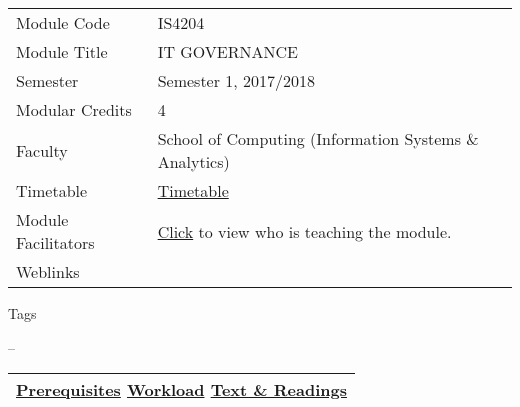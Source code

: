 \hypertarget{ctl00_ctl00_ContentPlaceHolder1_ContentPlaceHolder1_LV_itemPlaceholderContainer}{}
\begin{longtable}[]{@{}ll@{}}
\toprule
\protect\hypertarget{ctl00_ctl00_ContentPlaceHolder1_ContentPlaceHolder1_LV_ctrl0_txtCode}{}{Module
Code} &
\protect\hypertarget{ctl00_ctl00_ContentPlaceHolder1_ContentPlaceHolder1_LV_ctrl0_lcCode}{}{IS4204}\tabularnewline
\protect\hypertarget{ctl00_ctl00_ContentPlaceHolder1_ContentPlaceHolder1_LV_ctrl0_lcCourse}{}{Module
Title} &
\protect\hypertarget{ctl00_ctl00_ContentPlaceHolder1_ContentPlaceHolder1_LV_ctrl0_lcCourseName}{}{IT
GOVERNANCE}\tabularnewline
\protect\hypertarget{ctl00_ctl00_ContentPlaceHolder1_ContentPlaceHolder1_LV_ctrl0_lcSemester}{}{Semester}
&
\protect\hypertarget{ctl00_ctl00_ContentPlaceHolder1_ContentPlaceHolder1_LV_ctrl0_lcSem}{}{Semester
1, 2017/2018}\tabularnewline
\protect\hypertarget{ctl00_ctl00_ContentPlaceHolder1_ContentPlaceHolder1_LV_ctrl0_lcModCredit}{}{Modular
Credits} &
\protect\hypertarget{ctl00_ctl00_ContentPlaceHolder1_ContentPlaceHolder1_LV_ctrl0_lcModC}{}{4}\tabularnewline
\protect\hypertarget{ctl00_ctl00_ContentPlaceHolder1_ContentPlaceHolder1_LV_ctrl0_lcFaculty}{}{Faculty}
&
\protect\hypertarget{ctl00_ctl00_ContentPlaceHolder1_ContentPlaceHolder1_LV_ctrl0_lcFac}{}{School
of Computing (Information Systems \& Analytics)}\tabularnewline
\protect\hypertarget{ctl00_ctl00_ContentPlaceHolder1_ContentPlaceHolder1_LV_ctrl0_Label1}{}{Timetable}
&
\protect\hypertarget{ctl00_ctl00_ContentPlaceHolder1_ContentPlaceHolder1_LV_ctrl0_Span1}{}{\href{javascript:void(0);}{Timetable}}\tabularnewline
\protect\hypertarget{ctl00_ctl00_ContentPlaceHolder1_ContentPlaceHolder1_LV_ctrl0_Label6}{}{Module
Facilitators} &
\protect\hypertarget{ctl00_ctl00_ContentPlaceHolder1_ContentPlaceHolder1_LV_ctrl0_Span2}{}{\href{list_lecturers.aspx?CourseID=21c4e096-2b45-4319-a41f-178883530efa\&ClickFrom=}{Click}
to view who is teaching the module.}\tabularnewline
\protect\hypertarget{ctl00_ctl00_ContentPlaceHolder1_ContentPlaceHolder1_LV_ctrl0_LabelCtrl1}{}{Weblinks}
&\tabularnewline
\bottomrule
\end{longtable}

\protect\hypertarget{ctl00_ctl00_ContentPlaceHolder1_ContentPlaceHolder1_LV_ctrl0_Label4}{}{Tags}

\protect\hypertarget{ctl00_ctl00_ContentPlaceHolder1_ContentPlaceHolder1_LV_ctrl0_lblTags}{}{--}

\begin{longtable}[]{@{}l@{}}
\toprule
\protect\hypertarget{ctl00_ctl00_ContentPlaceHolder1_ContentPlaceHolder1_lblSectionMiddle}{}{\protect\hyperlink{Prerequisites}{Prerequisites}
\textbar{} \protect\hyperlink{Workload}{Workload} \textbar{}
\protect\hyperlink{References}{Text \& Readings}}\tabularnewline
\bottomrule
\end{longtable}


